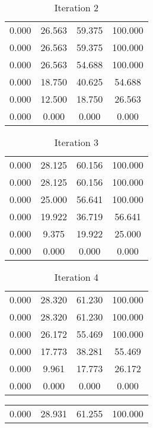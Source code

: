 \documentclass{article}
\begin{document}
\begin{homeworkProblem}
{\begin{multicols}{2}
\begin{table}[H]
\begin{tabular}{c c c c}
					0.000  &  26.563  &  59.375  &  100.000   \\
					0.000  &  26.563  &  59.375  &  100.000   \\
					0.000  &  26.563  &  54.688  &  100.000   \\
					0.000  &  18.750  &  40.625  &  54.688    \\
					0.000  &  12.500  &  18.750  &  26.563    \\
					0.000  &  0.000   &  0.000   &  0.000     \\
				\end{tabular}
				\caption{Iteration 2}
			\end{table}
			\begin{table}[H]
				\centering
				\begin{tabular}{c c c c}
					0.000  &  28.125  &  60.156  &  100.000   \\
					0.000  &  28.125  &  60.156  &  100.000   \\
					0.000  &  25.000  &  56.641  &  100.000   \\
					0.000  &  19.922  &  36.719  &  56.641    \\
					0.000  &  9.375   &  19.922  &  25.000    \\
					0.000  &  0.000   &  0.000   &  0.000     \\
				\end{tabular}
				\caption{Iteration 3}
			\end{table}
			\end{multicols}
			\begin{multicols}{2}
			\begin{table}[H]
				\centering
				\begin{tabular}{c c c c}
					0.000  &  28.320  &  61.230  &  100.000   \\
					0.000  &  28.320  &  61.230  &  100.000   \\
					0.000  &  26.172  &  55.469  &  100.000   \\
					0.000  &  17.773  &  38.281  &  55.469    \\
					0.000  &  9.961   &  17.773  &  26.172    \\
					0.000  &  0.000   &  0.000   &  0.000     \\
				\end{tabular}
				\caption{Iteration 4}
			\end{table}
			\begin{table}[H]
				\centering
				\begin{tabular}{c c c c}
					0.000  &  28.931  &  61.255  &  100.000   \\

\end{tabular}
\end{table}
\end{multicols}}
\end{homeworkProblem}
\end{document}
